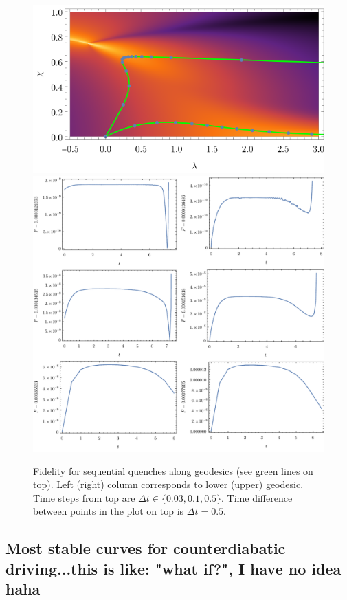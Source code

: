\begin{figure}[H]
    \centering
    \includegraphics[scale=1.2]{../img/bg123.pdf}
    \includegraphics[scale=0.6]{../img/plotsFidelityQuenches.pdf}
    \caption{Fidelity for sequential quenches along geodesics (see green lines on top). Left (right) column corresponds to lower (upper) geodesic. Time steps from top are $\Delta t\in \{0.03,0.1,0.5\}$. Time difference between points in the plot on top is $\Delta t=0.5$.}
    \label{fig:plotsFidelityQuenches}    
\end{figure}







\subsection{Most stable curves for counterdiabatic driving...this is like: "what if?", I have no idea haha}